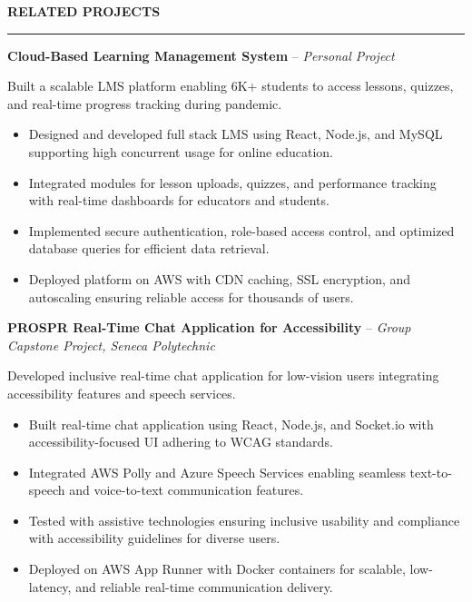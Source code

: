 \documentclass[10pt,letterpaper]{article}
\begin{document}
\vspace{6pt}

\textbf{RELATED PROJECTS}\\[-8pt]
\noindent\rule{\textwidth}{1pt}

\vspace{-2pt}

\textbf{Cloud-Based Learning Management System} -- \emph{Personal Project}

\vspace{-1pt}

Built a scalable LMS platform enabling 6K+ students to access lessons, quizzes, and real-time progress tracking during pandemic.
\vspace{-1pt}
\begin{itemize}
\item Designed and developed full stack LMS using React, Node.js, and MySQL supporting high concurrent usage for online education.
\item Integrated modules for lesson uploads, quizzes, and performance tracking with real-time dashboards for educators and students.
\item Implemented secure authentication, role-based access control, and optimized database queries for efficient data retrieval.
\item Deployed platform on AWS with CDN caching, SSL encryption, and autoscaling ensuring reliable access for thousands of users.
\end{itemize}

\textbf{PROSPR  Real-Time Chat Application for Accessibility} -- \emph{Group Capstone Project, Seneca Polytechnic}

\vspace{-1pt}

Developed inclusive real-time chat application for low-vision users integrating accessibility features and speech services.
\vspace{-1pt}
\begin{itemize}
\item Built real-time chat application using React, Node.js, and Socket.io with accessibility-focused UI adhering to WCAG standards.
\item Integrated AWS Polly and Azure Speech Services enabling seamless text-to-speech and voice-to-text communication features.
\item Tested with assistive technologies ensuring inclusive usability and compliance with accessibility guidelines for diverse users.
\item Deployed on AWS App Runner with Docker containers for scalable, low-latency, and reliable real-time communication delivery.
\end{itemize}
\end{document}
